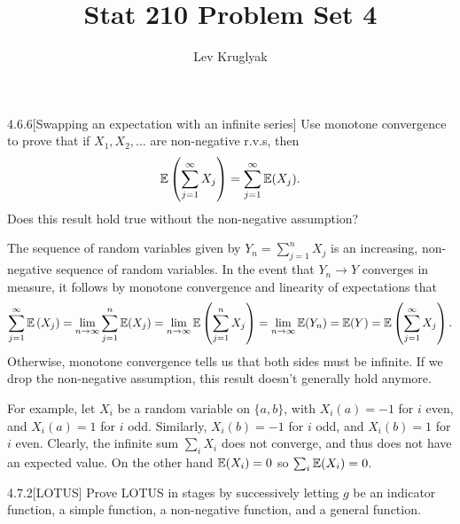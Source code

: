 \documentclass{pset}
\title{Stat 210 Problem Set 4}
\author{Lev Kruglyak}
\begin{document}
\maketitle
\collaborators

\begin{problem}{4.6.6}[Swapping an expectation with an infinite series]
  Use monotone convergence to prove that if $X_1, X_2, \ldots$ are non-negative r.v.s, then 
  \[\mathbb{E}\left(\sum^\infty_{j=1} X_j\right) = \sum^\infty_{j=1}\mathbb{E}(X_j).\]
  Does this result hold true without the non-negative assumption?
\end{problem}

\begin{solution}
  The sequence of random variables given by $Y_n = \sum^n_{j=1} X_j$ is an increasing, non-negative sequence of random variables. In the event that $Y_n \to Y$ converges in measure, it follows by monotone convergence and linearity of expectations that
  \[
    \sum^\infty_{j=1} \mathbb{E}\left(X_j\right) = \lim_{n\to \infty}\sum^n_{j=1}\mathbb{E}(X_j) = \lim_{n\to \infty}\mathbb{E}\left(\sum^n_{j=1} X_j\right) = \lim_{n\to \infty}\mathbb{E}(Y_n) = \mathbb{E}(Y) = \mathbb{E}\left(\sum^\infty_{j=1} X_j\right).
  \]
  Otherwise, monotone convergence tells us that both sides must be infinite. If we drop the non-negative assumption, this result doesn't generally hold anymore. 

  For example, let $X_i$ be a random variable on $\{a,b\}$, with $X_i(a)=-1$ for $i$ even, and $X_i(a)=1$ for $i$ odd. Similarly, $X_i(b)=-1$ for $i$ odd, and $X_i(b)=1$ for $i$ even. 
  Clearly, the infinite sum $\sum_i X_i$ does not converge, and thus does not have an expected value. On the other hand $\mathbb{E}(X_i)=0$ so $\sum_i \mathbb{E}(X_i)=0$.
\end{solution}

\begin{problem}{4.7.2}[LOTUS]
  Prove LOTUS in stages by successively letting $g$ be an indicator function, a simple function, a non-negative function, and a general function.
\end{problem}
\end{document}
